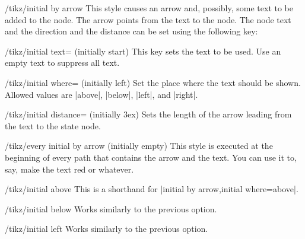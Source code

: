 \begin{stylekey}{/tikz/initial by arrow}
    This style causes an arrow and, possibly, some text to be added to the
    node. The arrow points from the text to the node. The node text and the
    direction and the distance can be set using the following key:
    \begin{key}{/tikz/initial text= (initially start)}
        This key sets the text to be used. Use an empty text to suppress all
        text.
    \end{key}
    \begin{key}{/tikz/initial where= (initially left)}
        Set the place where the text should be shown. Allowed values are
        |above|, |below|, |left|, and |right|.
    \end{key}
    \begin{key}{/tikz/initial distance= (initially 3ex)}
        Sets the length of the arrow leading from the text to the state node.
    \end{key}
    \begin{stylekey}{/tikz/every initial by arrow (initially \normalfont empty)}
        This style is executed at the beginning of every path that contains the
        arrow and the text. You can use it to, say, make the text red or
        whatever.
    \end{stylekey}
\begin{codeexample}[preamble={\usetikzlibrary{automata}}]
\end{codeexample}
\end{stylekey}

\begin{stylekey}{/tikz/initial above}
    This is a shorthand for |initial by arrow,initial where=above|.
\end{stylekey}

\begin{stylekey}{/tikz/initial below}
    Works similarly to the previous option.
\end{stylekey}

\begin{stylekey}{/tikz/initial left}
    Works similarly to the previous option.
\end{stylekey}

